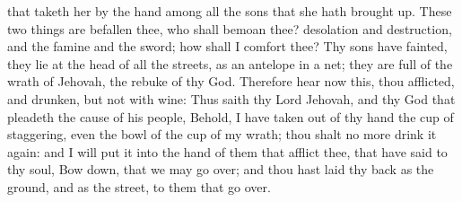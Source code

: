 that taketh her by the hand among all the sons that she hath brought up. These two things are befallen thee, who shall bemoan thee? desolation and destruction, and the famine and the sword; how shall I comfort thee? Thy sons have fainted, they lie at the head of all the streets, as an antelope in a net; they are full of the wrath of Jehovah, the rebuke of thy God.  Therefore hear now this, thou afflicted, and drunken, but not with wine: Thus saith thy Lord Jehovah, and thy God that pleadeth the cause of his people, Behold, I have taken out of thy hand the cup of staggering, even the bowl of the cup of my wrath; thou shalt no more drink it again: and I will put it into the hand of them that afflict thee, that have said to thy soul, Bow down, that we may go over; and thou hast laid thy back as the ground, and as the street, to them that go over. 

